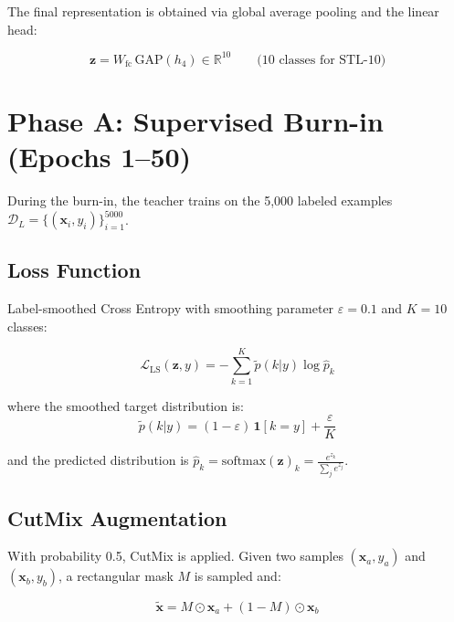 \documentclass[12pt, a4paper]{article}
\begin{document}
The final representation is obtained via global average pooling and the linear head:

\begin{equation}
  \mathbf{z} = W_{\text{fc}}\,\text{GAP}(h_4) \in \mathbb{R}^{10}
  \qquad \text{(10 classes for STL-10)}
\end{equation}

\section{Phase A: Supervised Burn-in (Epochs 1--50)}

During the burn-in, the teacher trains on the 5,000 labeled examples $\mathcal{D}_L = \{(\mathbf{x}_i, y_i)\}_{i=1}^{5000}$.

\subsection{Loss Function}

Label-smoothed Cross Entropy with smoothing parameter $\varepsilon = 0.1$ and $K = 10$ classes:

\begin{equation}
  \mathcal{L}_{\text{LS}}(\mathbf{z}, y) = -\sum_{k=1}^{K} \tilde{p}(k|y) \log \hat{p}_k
  \label{eq:label_smooth}
\end{equation}

where the smoothed target distribution is:
\begin{equation}
  \tilde{p}(k|y) = (1-\varepsilon)\,\mathbf{1}[k = y] + \frac{\varepsilon}{K}
\end{equation}

and the predicted distribution is $\hat{p}_k = \text{softmax}(\mathbf{z})_k = \frac{e^{z_k}}{\sum_j e^{z_j}}$.

\subsection{CutMix Augmentation}

With probability 0.5, CutMix is applied. Given two samples $(\mathbf{x}_a, y_a)$ and $(\mathbf{x}_b, y_b)$, a rectangular mask $M$ is sampled and:

\begin{equation}
  \tilde{\mathbf{x}} = M \odot \mathbf{x}_a + (1 - M) \odot \mathbf{x}_b
\end{equation}
\end{document}

